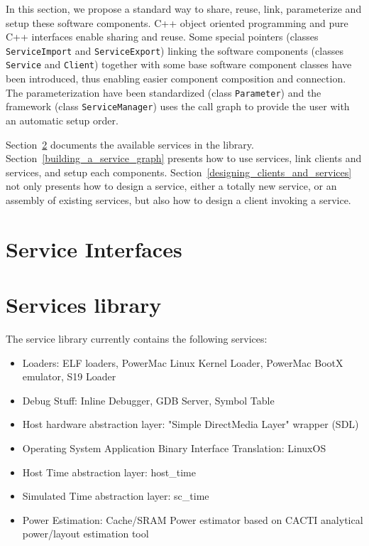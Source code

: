 In this section, we propose a standard way to share, reuse, link, parameterize and setup these software components.
C++ object oriented programming and pure C++ interfaces enable sharing and reuse.
Some special pointers (classes \texttt{ServiceImport} and \texttt{ServiceExport}) linking the software components (classes \texttt{Service} and \texttt{Client}) together with some base software component classes have been introduced, thus enabling easier component composition and connection.
The parameterization have been standardized (class \texttt{Parameter}) and the framework (class \texttt{ServiceManager}) uses the call graph to provide the user with an automatic setup order.

Section~\ref{services_library} documents the available services in the library. Section~\ref{building_a_service_graph} presents how to use services, link clients and services, and setup each components. Section~\ref{designing_clients_and_services} not only presents how to design a service, either a totally new service, or an assembly of existing services, but also how to design a client invoking a service.


\section{Service Interfaces}
\label{service_interfaces}

\section{Services library}
\label{services_library}

The service library currently contains the following services:
\begin{itemize}
	\item Loaders: ELF loaders, PowerMac Linux Kernel Loader, PowerMac BootX emulator, S19 Loader
	\item Debug Stuff: Inline Debugger, GDB Server, Symbol Table
	\item Host hardware abstraction layer: "Simple DirectMedia Layer" wrapper (SDL)
	\item Operating System Application Binary Interface Translation: LinuxOS
	\item Host Time abstraction layer: host\_time
	\item Simulated Time abstraction layer: sc\_time
	\item Power Estimation: Cache/SRAM Power estimator based on CACTI analytical power/layout estimation tool
\end{itemize}

